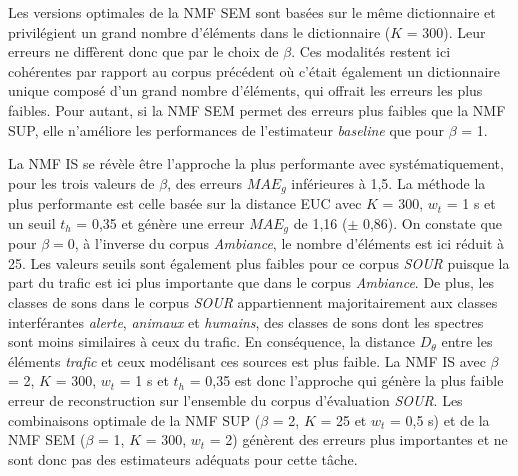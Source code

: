 Les versions optimales de la NMF SEM sont basées sur le même dictionnaire et privilégient un grand nombre d'éléments dans le dictionnaire ($K$ = 300). Leur erreurs ne diffèrent donc que par le choix de $\beta$. Ces modalités restent ici cohérentes par rapport au corpus précédent où c'était également un dictionnaire unique composé d'un grand nombre d'éléments, qui offrait les erreurs les plus faibles. Pour autant, si la NMF SEM permet des erreurs plus faibles que la NMF SUP, elle n'améliore les performances de l'estimateur \textit{baseline} que pour $\beta$ = 1.  

La NMF IS se révèle être l'approche la plus performante avec systématiquement, pour les trois valeurs de $\beta$, des erreurs $MAE_g$ inférieures à 1,5. La méthode la plus performante est celle basée sur la distance EUC avec $K$ = 300, $w_t$ = 1 s et un seuil $t_h$ = 0,35 et génère une erreur $MAE_g$ de 1,16 ($\pm$ 0,86). On constate que pour $\beta = 0$, à l'inverse du corpus \textit{Ambiance}, le nombre d'éléments est ici réduit à 25. 
Les valeurs seuils sont également plus faibles pour ce corpus \textit{SOUR} puisque la part du trafic est ici plus importante que dans le corpus \textit{Ambiance}. De plus, les classes de sons dans le corpus \textit{SOUR} appartiennent majoritairement aux classes interférantes \textit{alerte}, \textit{animaux} et \textit{humains}, des classes de sons dont les spectres sont moins similaires à ceux du trafic. En conséquence, la distance $D_{\theta}$ entre les éléments \textit{trafic} et ceux modélisant ces sources est plus faible. 
La NMF IS avec $\beta$ = 2, $K$ = 300, $w_t$ = 1 s et $t_h$ = 0,35 est donc l'approche qui génère la plus faible erreur de reconstruction sur l'ensemble du corpus d'évaluation \textit{SOUR}. Les combinaisons optimale de la NMF SUP ($\beta$ = 2, $K$ = 25 et $w_t$ = 0,5 s) et de la NMF SEM ($\beta$ = 1, $K$ = 300, $w_t$ = 2) génèrent des erreurs plus importantes et ne sont donc pas des estimateurs adéquats pour cette tâche.

